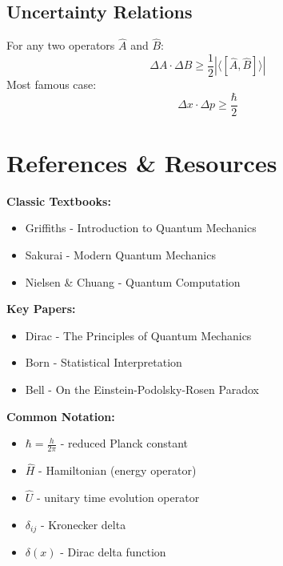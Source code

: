 \documentclass{a3cheatsheet}
\begin{document}
\begin{multicols}{3}
\subsection{Uncertainty Relations}

\begin{formulabox}
For any two operators $\hat{A}$ and $\hat{B}$:
$$\Delta A \cdot \Delta B \geq \frac{1}{2}|\langle[\hat{A},\hat{B}]\rangle|$$
Most famous case:
$$\Delta x \cdot \Delta p \geq \frac{\hbar}{2}$$
\end{formulabox}


\section{References \& Resources}

\begin{infobox}
\textbf{Classic Textbooks:}
\begin{itemize}
    \item Griffiths - Introduction to Quantum Mechanics
    \item Sakurai - Modern Quantum Mechanics
    \item Nielsen \& Chuang - Quantum Computation
\end{itemize}

\textbf{Key Papers:}
\begin{itemize}
    \item Dirac - The Principles of Quantum Mechanics
    \item Born - Statistical Interpretation
    \item Bell - On the Einstein-Podolsky-Rosen Paradox
\end{itemize}
\end{infobox}

\begin{notebox}
\textbf{Common Notation:}
\begin{itemize}
    \item $\hbar = \frac{h}{2\pi}$ - reduced Planck constant
    \item $\hat{H}$ - Hamiltonian (energy operator)
    \item $\hat{U}$ - unitary time evolution operator
    \item $\delta_{ij}$ - Kronecker delta
    \item $\delta(x)$ - Dirac delta function
\end{itemize}
\end{notebox}

\end{multicols}
\end{document}
